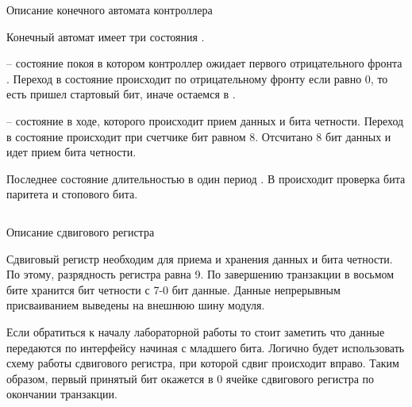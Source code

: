 %


\begin{listing}[H]
	\inputminted{SystemVerilog}{code_examples/lab_6/state_m.sv}
	\caption{Описание конечного автомата контроллера}
\end{listing}


\par{Конечный автомат имеет три состояния .}

\par{ – состояние покоя в котором контроллер ожидает первого отрицательного фронта . Переход в состояние  происходит по отрицательному фронту  если  равно 0, то есть пришел стартовый бит, иначе остаемся в .}

\par{ – состояние в ходе, которого происходит прием данных и бита четности. Переход в состояние  происходит при счетчике бит равном 8. Отсчитано 8 бит данных и идет прием бита четности.}

\par{Последнее состояние  длительностью в один период . В  происходит проверка бита паритета и стопового бита.}

%


\begin{listing}[H]
	\inputminted{SystemVerilog}{code_examples/lab_6/shift.sv}
	\caption{Описание сдвигового регистра}
\end{listing}

\par{Сдвиговый регистр необходим для приема и хранения данных и бита четности. По этому, разрядность регистра равна 9. По завершению транзакции в восьмом бите хранится бит четности с 7-0 бит данные. Данные непрерывным присваиванием выведены на внешнюю шину модуля.}

\par{Если обратиться к началу лабораторной работы то стоит заметить что данные передаются по интерфейсу  начиная с младшего бита. Логично будет использовать схему работы сдвигового регистра, при которой сдвиг происходит вправо. Таким образом, первый принятый бит окажется в 0 ячейке сдвигового регистра по окончании транзакции.}

